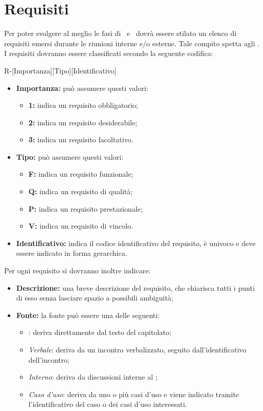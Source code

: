 \newpage
\section{Requisiti}
Per poter svolgere al meglio le fasi di \PA\ e \PD\ dovrà essere stilato un elenco di requisiti emersi durante le riunioni interne e/o esterne. Tale compito spetta agli \textit{\AnP}. I requisiti dovranno
essere classificati secondo la seguente codifica:

\begin{center}
R-[Importanza][Tipo][Identificativo]
\end{center}
\begin{itemize}
	\item \textbf{Importanza:} può assumere questi valori:
  		\begin{itemize}
    		\item \textbf{1:} indica un requisito obbligatorio;
    		\item \textbf{2:} indica un requisito desiderabile;
    		\item \textbf{3:} indica un requisito facoltativo.
  		\end{itemize}
  	\item \textbf{Tipo:} può assumere questi valori:
  		\begin{itemize}
   		 	\item \textbf{F:} indica un requisito funzionale;
    		\item \textbf{Q:} indica un requisito di qualità;
    		\item \textbf{P:} indica un requisito prestazionale;
    		\item \textbf{V:} indica un requisito di vincolo.
  		\end{itemize}
  	\item \textbf{Identificativo:} indica il codice identificativo del requisito, è univoco e deve essere indicato in forma gerarchica.
\end{itemize}
Per ogni requisito si dovranno inoltre indicare:
\begin{itemize}
  \item \textbf{Descrizione:} una breve descrizione del requisito, che chiarisca tutti i punti di esso senza lasciare spazio a possibili ambiguità;
  \item \textbf{Fonte:} la fonte può essere una delle seguenti:
  \begin{itemize}
    \item \textit{}: deriva direttamente dal testo del capitolato;
    \item \textit{Verbale}: deriva da un incontro verbalizzato, seguito dall'identificativo dell'incontro;
    \item \textit{Interno}: deriva da discussioni interne al ;
    \item \textit{Caso d'uso}: deriva da uno o più casi d'uso e viene indicato tramite l'identificativo del caso o dei casi d'uso interessati.
  \end{itemize}
\end{itemize}

